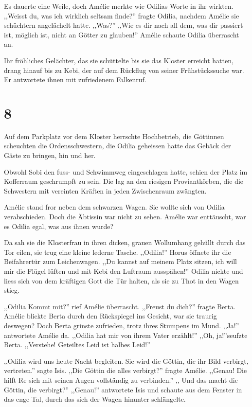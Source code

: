 \documentclass[11pt,titlepage,a5paper]{book}
\begin{document}
Es dauerte eine Weile, doch Amélie merkte wie Odilias Worte in ihr wirkten. ,,Weisst du, was ich wirklich seltsam finde?'' fragte Odilia, nachdem Amélie sie schüchtern angelächelt hatte. ,,Was?'' ,,Wie es dir nach all dem, was dir passiert ist, möglich ist, nicht an Götter zu glauben!'' Amélie schaute Odilia überrascht an.

Ihr fröhliches Gelächter, das sie schüttelte bis sie das Kloster erreicht hatten, drang hinauf bis zu Kebi, der auf dem Rückflug von seiner Frühstückssuche war. Er antwortete ihnen mit zufriedenem Falkenruf.


\section*{8}

Auf dem Parkplatz vor dem Kloster herrschte Hochbetrieb, die Göttinnen scheuchten die Ordensschwestern, die Odilia geheissen hatte das Gebäck der Gäste zu bringen, hin und her.

Obwohl Sobi den fuss- und Schwimmweg eingeschlagen hatte, schien der Platz im Kofferraum geschrumpft zu sein. Die lag an den riesigen Proviantkörben, die die Schwestern mit  vereinten Kräften in jeden Zwischenraum zwängten. 

Amélie stand fror neben dem schwarzen Wagen. Sie wollte sich von Odilia verabschieden. Doch die Äbtissin war nicht zu sehen. Amélie war enttäuscht, war es Odilia egal, was aus ihnen wurde?

Da sah sie die Klosterfrau in ihren dicken, grauen Wollumhang gehüllt durch das Tor eilen, sie trug eine kleine lederne Tasche. ,,Odilia!'' Horus öffnete ihr die Beifahrertür zum Leichenwagen. ,,Du kannst auf meinem Platz sitzen, ich will mir die Flügel lüften und mit Kebi den Luftraum ausspähen!'' Odilia nickte und liess sich von dem kräftigen Gott die Tür halten, als sie zu Thot in den Wagen stieg.

,,Odilia Kommt mit?'' rief Amélie überrascht. ,,Freust du dich?'' fragte Berta. Amélie blickte Berta durch den Rückspiegel ins Gesicht, war sie traurig deswegen? Doch Berta grinste zufrieden, trotz ihres Stumpens im Mund. ,,Ja!'' antwortete Amélie da. ,,Odilia hat mir von ihrem Vater erzählt!'' ,,Oh, ja!''seufzte Berta. ,,Verstehe! Geteiltes Leid ist halbes Leid!''

,,Odilia wird uns heute Nacht begleiten. Sie wird die Göttin, die ihr Bild verbirgt, vertreten.'' sagte Isis. ,,Die Göttin die alles verbirgt?'' fragte Amélie. ,,Genau! Die hilft Re sich mit seinen Augen vollständig zu verbinden.'' ,, Und das macht die Göttin, die  verbirgt?'' ,,Genau!'' antwortete Isis und schaute aus dem Fenster in das enge Tal, durch das sich der Wagen hinunter schlängelte.
\end{document}
